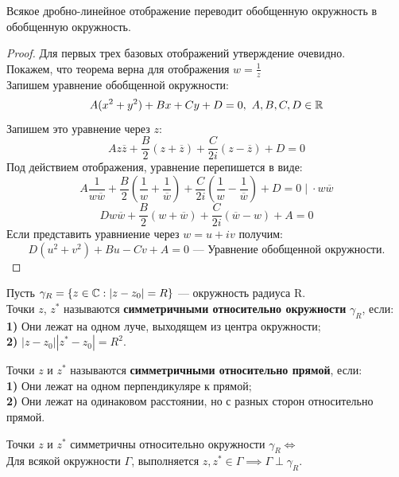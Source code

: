 	\begin{theorem}
		Всякое дробно-линейное отображение переводит обобщенную окружность в обобщенную окружность.
	\end{theorem}
	\begin{proof}
		Для первых трех базовых отображений утверждение очевидно. \\
		Покажем, что теорема верна для отображения $w = \frac{1}{z}$\\
		Запишем уравнение обобщенной окружности:
		\[ A(x^2 + y^2) + Bx + Cy + D = 0, \ A, B, C, D \in \mathbb{R} \]
		Запишем это уравнение через $z$:
		\[ Az\overline{z} + \frac{B}{2}(z + \overline{z}) + \frac{C}{2i}(z - \overline{z}) + D = 0 \]
		Под действием отображения, уравнение перепишется в виде: 
		\[ A \frac{1}{w\overline w} + \frac{B}{2}\left(\frac{1}{w} + \frac{1}{\overline w}\right) + \frac{C}{2i}\left(\frac{1}{w} - \frac{1}{\overline w}\right) + D = 0 \;|\; \cdot w \overline w \]
		\[Dw \overline w + \frac{B}{2}(w + \overline w) + \frac{C}{2i}(\overline w - w) + A = 0\]
		Если представить уравниение через $ w = u + iv $ получим:
		\[D(u^2 + v^2) + B u - C v + A = 0 \text{ --- Уравнение обобщенной окружности.}\]
	\end{proof}
	\vspace{-0.5cm}
	\begin{definition}
		Пусть $\gamma_R = \{ z \in \mathbb{C} : |z - z_0| = R \}$ --- окружность радиуса R.\\
		Точки $z$, $z^*$ называются \textbf{симметричными относительно окружности} $\gamma_R$, если:\\
		\textbf{1)} Они лежат на одном луче, выходящем из центра окружности;\\
		\textbf{2)} $|z-z_0||z^*-z_0| = R^2$.
	\end{definition}
	\begin{definition}
		Точки $z$ и $z^*$ называются \textbf{симметричными относительно прямой}, если:\\
		\textbf{1)} Они лежат на одном перпендикуляре к прямой;\\ 
		\textbf{2)} Они лежат на одинаковом расстоянии, но с разных сторон относительно прямой.
	\end{definition}
	\begin{statement}
		Точки $z$ и $z^*$ симметричны относительно окружности $\gamma_R \iff$\\
		Для всякой окружности $\Gamma$, выполняется $z, z^* \in \Gamma \implies \Gamma \perp \gamma_R$.
	\end{statement}
